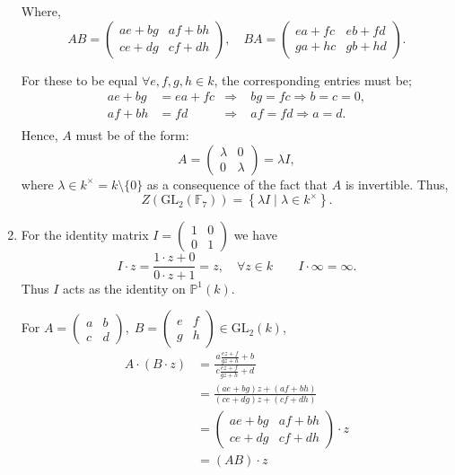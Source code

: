 \documentclass[12pt]{article}
\begin{document}
\begin{enumerate}[label=(\arabic*)]
Where,
\[
AB = \begin{pmatrix} ae + bg & af + bh \\ ce + dg & cf + dh \end{pmatrix}, \quad
BA = \begin{pmatrix} ea + fc & eb + fd \\ ga + hc & gb + hd \end{pmatrix}.
\]

For these to be equal \( \forall e, f, g, h \in k \), the corresponding entries must be;
\[
\begin{aligned}
ae + bg &= ea + fc &\Longrightarrow&\; bg = fc \Longrightarrow b = c = 0,\\
af + bh &= fd         &\Longrightarrow&\; af = fd \Longrightarrow a = d.\\
\end{aligned}
\]
Hence, \( A \) must be of the form:
\[
A = \begin{pmatrix} \lambda & 0 \\ 0 & \lambda \end{pmatrix} = \lambda I,
\]
where \( \lambda \in k^\times = k \setminus \{0\} \) as a consequence of the fact that \( A \) is invertible. Thus,
\[
Z(\mathrm{GL}_2(\mathbb{F}_7)) = \left\{ \lambda I \mid \lambda \in k^\times \right\}.
\]

\item
For the identity matrix \(I=\begin{pmatrix}1&0\\0&1\end{pmatrix}\) we have
\[
I\cdot z = \frac{1\cdot z+0}{0\cdot z+1}=z, \quad \forall z\in k
\qquad
I\cdot\infty = \infty.
\]
Thus \(I\) acts as the identity on \(\mathbb{P}^1(k)\).

For
\(A=\begin{pmatrix}a&b\\ c&d\end{pmatrix},
 \;B=\begin{pmatrix}e&f\\ g&h\end{pmatrix}\in\mathrm{GL}_2(k)\),
\[
\begin{aligned}
A\cdot(B\cdot\! z)
     &=\frac{a\frac{ez+f}{gz+h}+b}{\,c\frac{ez+f}{gz+h}+d\,} \\
     &=\frac{(ae+bg)z+(af+bh)}{(ce+dg)z+(cf+dh)} \\
     &=\begin{pmatrix}ae+bg&af+bh\\ ce+dg&cf+dh\end{pmatrix} \cdot z \\
     &= (AB) \cdot z
\end{aligned}
\]


\end{enumerate}
\end{document}
